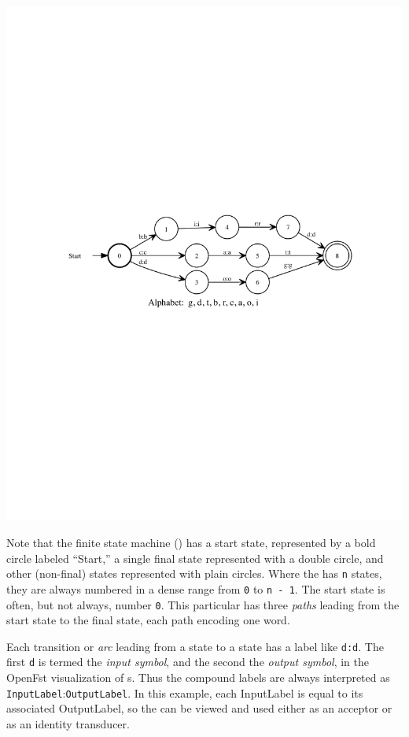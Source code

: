 \begin{center}
\includegraphics[width=135mm]{images/dogcatbird.pdf}
\end{center}


Note that the finite state machine () has a start state, represented by a bold
circle labeled ``Start,'' a single final state represented with a double circle, and
other (non-final) states
represented with plain circles.  Where the \fsm{} has \texttt{n} states, they are
always numbered in a dense range from \texttt{0} to \texttt{n - 1}.  The start state is
often, but not always, number \texttt{0}.   This particular \fsm{} has three \emph{paths} leading from the
start state to the final state, each path encoding one word.

Each transition or \emph{arc} leading from a state to a
state has a label like \texttt{d:d}.  The first \texttt{d} is termed the \emph{input
symbol}, and the second the \emph{output symbol}, in the OpenFst visualization of
s.  Thus the compound labels are always interpreted as
\texttt{InputLabel}:\texttt{OutputLabel}.  In this example, each
InputLabel is equal to its associated OutputLabel, so the 
can be viewed and used either as an acceptor or as an identity transducer.

